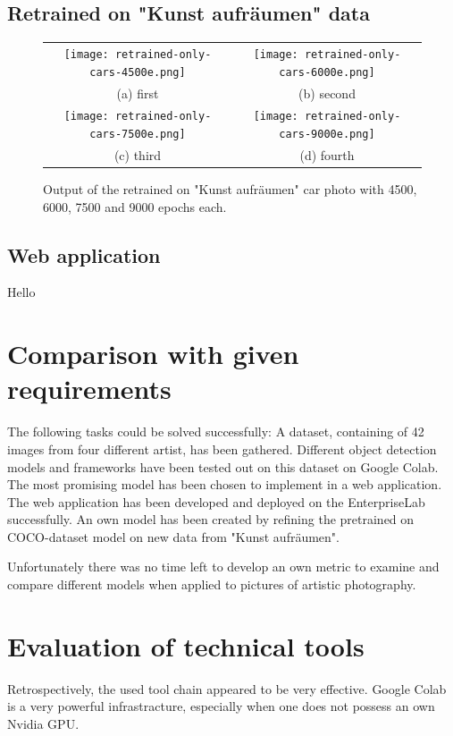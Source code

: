 \subsection{Retrained on "Kunst aufräumen" data}

\begin{figure}[H]
\begin{tabular}{cc}
 \texttt{[image: retrained-only-cars-4500e.png]} &   \texttt{[image: retrained-only-cars-6000e.png]} \\
(a) first & (b) second \\[6pt]
 \texttt{[image: retrained-only-cars-7500e.png]} &   \texttt{[image: retrained-only-cars-9000e.png]} \\
(c) third & (d) fourth \\[6pt]
\end{tabular}
\caption{Output of the retrained on "Kunst aufräumen" car photo with 4500, 6000, 7500 and 9000 epochs each.}
\end{figure}

\subsection{Web application}

Hello

\section{Comparison with given requirements}

The following tasks could be solved successfully: A dataset, containing of 42 images from four different artist, has been gathered. Different object detection models and frameworks have been tested out on this dataset on Google Colab. The most promising model has been chosen to implement in a web application. The web application has been developed and deployed on the EnterpriseLab successfully. An own model has been created by refining the pretrained on COCO-dataset model on new data from "Kunst aufräumen".

Unfortunately there was no time left to develop an own metric to examine and compare different models when applied to pictures of artistic photography.

\section{Evaluation of technical tools}

Retrospectively, the used tool chain appeared to be very effective. Google Colab is a very powerful infrastracture, especially when one does not possess an own Nvidia GPU. 

